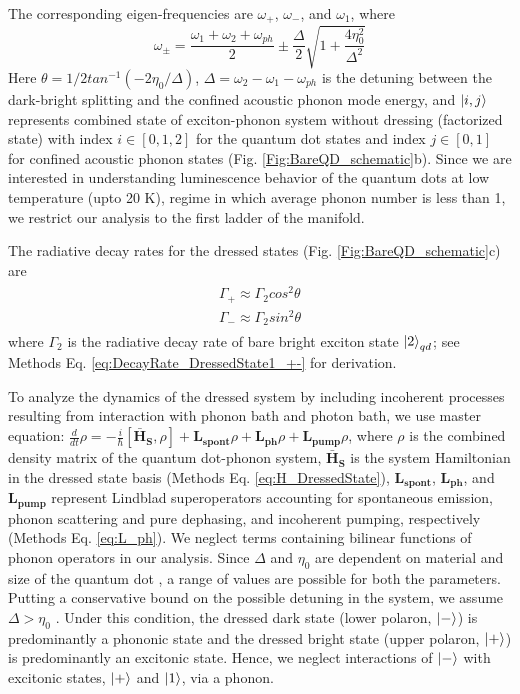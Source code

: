 \documentclass[aps,pra,preprint,groupedaddress]{revtex4-1}
\begin{document}
The corresponding eigen-frequencies are $\omega_{+}$, $\omega_{-}$, and $\omega_{1}$, where
\begin{equation}
\label{eq:eigenenergies_+-}
\omega_{\pm} = \frac{\omega_1 + \omega_2 + \omega_{ph}}{2} \pm \frac{\Delta}{2}\sqrt{1+\frac{4\eta_0^2}{\Delta^2}}
\end{equation}
Here $\theta=1/2 tan^{-1}(-2\eta_0/\Delta)$, $\Delta=\omega_2-\omega_1-\omega_{ph}$ is the detuning between the dark-bright splitting and the confined acoustic phonon mode energy, and $\ket{i,j}$ represents combined state of exciton-phonon system without dressing (factorized state) with index $i \in [0,1,2]$ for the quantum dot states and index $j \in [0,1]$ for confined acoustic phonon states (Fig. \ref{Fig:BareQD_schematic}b). Since we are interested in understanding luminescence behavior of the quantum dots at low temperature (upto 20 K), regime in which average phonon number is less than 1, we restrict our analysis to the first ladder of the manifold.

The radiative decay rates for the dressed states (Fig. \ref{Fig:BareQD_schematic}c) are 
\begin{eqnarray}
\begin{aligned}
\label{eq:DecayRate_DressedState2_+}
\Gamma_+  \approx \Gamma_2 cos^2\theta \\
\label{eq:DecayRate_DressedState2_-}
\Gamma_- \approx \Gamma_2 sin^2\theta 
\end{aligned}
\end{eqnarray}
where $\Gamma_2$ is the radiative decay rate of bare bright exciton state $\ket{2}_{qd}$; see Methods Eq.  \ref{eq:DecayRate_DressedState1_+-} for derivation.


To analyze the dynamics of the dressed system by including incoherent processes resulting from interaction with phonon bath and photon bath, we use master equation: $\frac{d}{dt} \rho =-\frac{i}{\hbar}[\mathbf{\bar{H}_S}, \rho] + \mathbf{L_{spont}}\rho + \mathbf{L_{ph}}\rho + \mathbf{L_{pump}}\rho$, where $\rho$ is the combined density matrix of the quantum dot-phonon system, $\mathbf{\bar{H}_S}$ is the system Hamiltonian in the dressed state basis (Methods Eq. \ref{eq:H_DressedState}), $\mathbf{L_{spont}}$, $\mathbf{L_{ph}}$, and $\mathbf{L_{pump}}$ represent Lindblad superoperators accounting for spontaneous emission, phonon scattering and pure dephasing, and incoherent pumping, respectively (Methods Eq. \ref{eq:L_ph}). We neglect terms containing bilinear functions of phonon operators in our analysis. Since $\Delta$ and $\eta_0$ are dependent on material and size of the quantum dot \cite{Takagahara1996,Sagar2008,Krauss1997}, a range of values are possible for both the parameters. Putting a conservative bound on the possible detuning in the system, we assume $\Delta > \eta_0$ . Under this condition, the dressed dark state (lower polaron, $\ket{-}$) is predominantly a phononic state and the dressed bright state (upper polaron, $\ket{+}$) is predominantly an excitonic state. Hence, we neglect interactions of $\ket{-}$ with excitonic states, $\ket{+}$ and $\ket{1}$, via a phonon.
\end{document}
